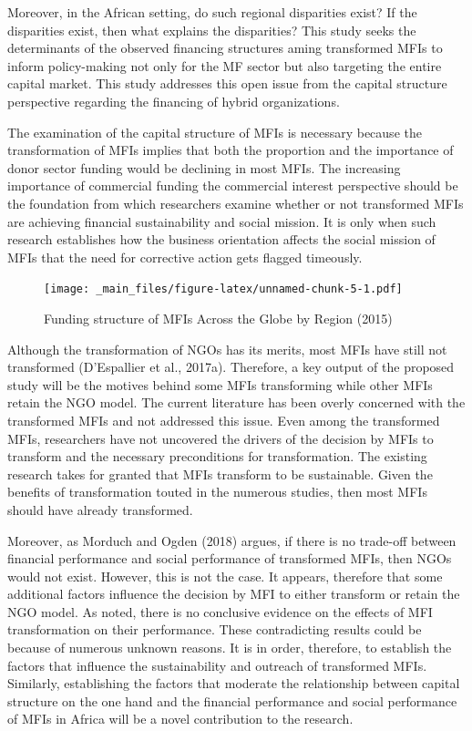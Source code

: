 \documentclass[a4paper, nobind]{templates/ociamthesis}
\begin{document}
Moreover, in the African setting, do such regional disparities exist? If the disparities exist, then what explains the disparities? This study seeks the determinants of the observed financing structures aming transformed MFIs to inform policy-making not only for the MF sector but also targeting the entire capital market. This study addresses this open issue from the capital structure perspective regarding the financing of hybrid organizations.

The examination of the capital structure of MFIs is necessary because the transformation of MFIs implies that both the proportion and the importance of donor sector funding would be declining in most MFIs. The increasing importance of commercial funding the commercial interest perspective should be the foundation from which researchers examine whether or not transformed MFIs are achieving financial sustainability and social mission. It is only when such research establishes how the business orientation affects the social mission of MFIs that the need for corrective action gets flagged timeously.

\begin{figure}
\centering
\texttt{[image: \_main\_files/figure-latex/unnamed-chunk-5-1.pdf]}
\caption{\label{fig:unnamed-chunk-5}Funding structure of MFIs Across the Globe by Region (2015)}
\end{figure}

Although the transformation of NGOs has its merits, most MFIs have still not transformed (D'Espallier et al., 2017a). Therefore, a key output of the proposed study will be the motives behind some MFIs transforming while other MFIs retain the NGO model. The current literature has been overly concerned with the transformed MFIs and not addressed this issue. Even among the transformed MFIs, researchers have not uncovered the drivers of the decision by MFIs to transform and the necessary preconditions for transformation. The existing research takes for granted that MFIs transform to be sustainable. Given the benefits of transformation touted in the numerous studies, then most MFIs should have already transformed.

Moreover, as Morduch and Ogden (2018) argues, if there is no trade-off between financial performance and social performance of transformed MFIs, then NGOs would not exist. However, this is not the case. It appears, therefore that some additional factors influence the decision by MFI to either transform or retain the NGO model. As noted, there is no conclusive evidence on the effects of MFI transformation on their performance. These contradicting results could be because of numerous unknown reasons. It is in order, therefore, to establish the factors that influence the sustainability and outreach of transformed MFIs. Similarly, establishing the factors that moderate the relationship between capital structure on the one hand and the financial performance and social performance of MFIs in Africa will be a novel contribution to the research.
\end{document}

